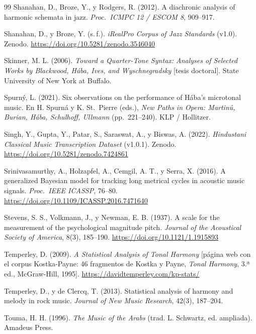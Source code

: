 \begin{thebibliography}{99}
Shanahan, D., Broze, Y., y Rodgers, R. (2012). A diachronic analysis of harmonic schemata in jazz. \emph{Proc.\ ICMPC 12
/ ESCOM 8}, 909--917.

Shanahan, D., y Broze, Y. (s.\,f.). \emph{iRealPro Corpus of Jazz Standards} (v1.0). Zenodo.
\url{https://doi.org/10.5281/zenodo.3546040}

Skinner, M. L. (2006). \emph{Toward a Quarter-Tone Syntax: Analyses of Selected Works by Blackwood, Hába, Ives, and
Wyschnegradsky} [tesis doctoral]. State University of New York at Buffalo.

Spurný, L. (2021). Six observations on the performance of Hába's microtonal music. En H. Spurná y K. St.~Pierre (eds.),
\emph{New Paths in Opera: Martinů, Burian, Hába, Schulhoff, Ullmann} (pp.~221--240). KLP / Hollitzer.

Singh, Y., Gupta, Y., Patar, S., Saraswat, A., y Biswas, A. (2022). \emph{Hindustani Classical Music Transcription
Dataset} (v1.0.1). Zenodo. \url{https://doi.org/10.5281/zenodo.7424861}

Srinivasamurthy, A., Holzapfel, A., Cemgil, A. T., y Serra, X. (2016). A generalized Bayesian model for tracking long
metrical cycles in acoustic music signals. \emph{Proc.\ IEEE ICASSP}, 76--80.
\url{https://doi.org/10.1109/ICASSP.2016.7471640}

Stevens, S. S., Volkmann, J., y Newman, E. B. (1937). A scale for the measurement of the psychological magnitude pitch.
\emph{Journal of the Acoustical Society of America}, 8(3), 185--190. \url{https://doi.org/10.1121/1.1915893}

Temperley, D. (2009). \emph{A Statistical Analysis of Tonal Harmony} [página web con el corpus Kostka-Payne: 46
fragmentos de Kostka y Payne, \emph{Tonal Harmony}, 3.ª ed., McGraw-Hill, 1995]. \url{https://davidtemperley.com/kp-stats/}

Temperley, D., y de Clercq, T. (2013). Statistical analysis of harmony and melody in rock music. \emph{Journal of New
Music Research}, 42(3), 187--204.

Touma, H. H. (1996). \emph{The Music of the Arabs} (trad. L. Schwartz, ed. ampliada). Amadeus Press.


\end{thebibliography}
